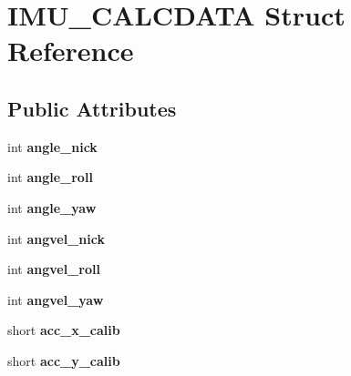 \hypertarget{struct_i_m_u___c_a_l_c_d_a_t_a}{\section{I\-M\-U\-\_\-\-C\-A\-L\-C\-D\-A\-T\-A Struct Reference}
\label{struct_i_m_u___c_a_l_c_d_a_t_a}
}
\subsection*{Public Attributes}
\begin{DoxyCompactItemize}
\item 
\hypertarget{struct_i_m_u___c_a_l_c_d_a_t_a_aae3005122b531a1ad1b924af815d3488}{int {\bfseries angle\-\_\-nick}}\label{struct_i_m_u___c_a_l_c_d_a_t_a_aae3005122b531a1ad1b924af815d3488}

\item 
\hypertarget{struct_i_m_u___c_a_l_c_d_a_t_a_ac6d46903f7a07c366ce33c4adf3d2fb5}{int {\bfseries angle\-\_\-roll}}\label{struct_i_m_u___c_a_l_c_d_a_t_a_ac6d46903f7a07c366ce33c4adf3d2fb5}

\item 
\hypertarget{struct_i_m_u___c_a_l_c_d_a_t_a_ae7e33b48e09793d0d21e5c28bba3dbaf}{int {\bfseries angle\-\_\-yaw}}\label{struct_i_m_u___c_a_l_c_d_a_t_a_ae7e33b48e09793d0d21e5c28bba3dbaf}

\item 
\hypertarget{struct_i_m_u___c_a_l_c_d_a_t_a_a2ac1c079ce0d921e67750df69bf93870}{int {\bfseries angvel\-\_\-nick}}\label{struct_i_m_u___c_a_l_c_d_a_t_a_a2ac1c079ce0d921e67750df69bf93870}

\item 
\hypertarget{struct_i_m_u___c_a_l_c_d_a_t_a_a0bbf00090f20e27b0ac83440c9179fc0}{int {\bfseries angvel\-\_\-roll}}\label{struct_i_m_u___c_a_l_c_d_a_t_a_a0bbf00090f20e27b0ac83440c9179fc0}

\item 
\hypertarget{struct_i_m_u___c_a_l_c_d_a_t_a_ad5860f013423e7fc0ffb1b2fb68df526}{int {\bfseries angvel\-\_\-yaw}}\label{struct_i_m_u___c_a_l_c_d_a_t_a_ad5860f013423e7fc0ffb1b2fb68df526}

\item 
\hypertarget{struct_i_m_u___c_a_l_c_d_a_t_a_a4181db6ed9acb4f015eb21cdad446217}{short {\bfseries acc\-\_\-x\-\_\-calib}}\label{struct_i_m_u___c_a_l_c_d_a_t_a_a4181db6ed9acb4f015eb21cdad446217}

\item 
\hypertarget{struct_i_m_u___c_a_l_c_d_a_t_a_af1bf9f7c5e33d660b19c25c630a9ccd2}{short {\bfseries acc\-\_\-y\-\_\-calib}}\label{struct_i_m_u___c_a_l_c_d_a_t_a_af1bf9f7c5e33d660b19c25c630a9ccd2}


\end{DoxyCompactItemize}
